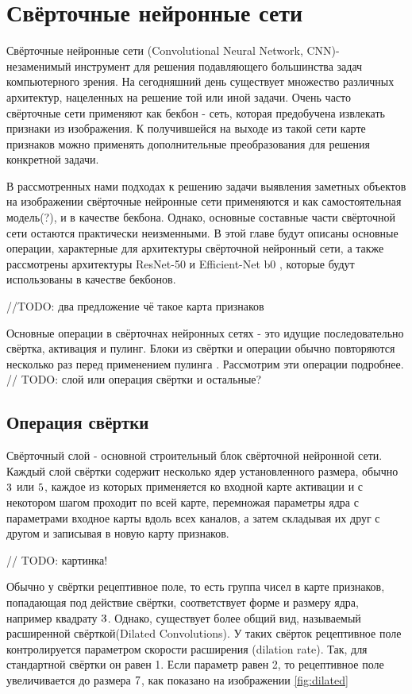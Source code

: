 \section{Свёрточные нейронные сети}


Свёрточные нейронные сети (Convolutional Neural Network, CNN)- незаменимый инструмент для решения подавляющего большинства задач компьютерного зрения. 
На сегодняшний день существует множество различных архитектур, нацеленных на решение той или иной задачи. 
Очень часто свёрточные сети применяют как бекбон - сеть, которая предобучена извлекать признаки из изображения. К получившейся 
на выходе из такой сети карте признаков можно применять дополнительные преобразования для решения конкретной задачи. 

В рассмотренных нами подходах к решению задачи выявления заметных объектов на изображении свёрточные нейронные сети 
применяются и как самостоятельная модель(?), и в качестве бекбона. Однако, основные составные части свёрточной сети 
остаются практически неизменными. В этой главе будут описаны основные операции, характерные для архитектуры свёрточной нейронный сети,
а также рассмотрены архитектуры ResNet-50\cite{ResNet} и Efficient-Net b0 \cite{Efficientnet}, которые будут использованы в качестве 
бекбонов.

//TODO: два предложение чё такое карта признаков

Основные операции в свёрточнах нейронных сетях - это идущие последовательно свёртка, активация и пулинг. Блоки из свёртки и операции
обычно повторяются несколько раз перед применением пулинга \cite{ResNet}. Рассмотрим эти операции подробнее.
// TODO: слой или операция свёртки и остальные? 


\subsection{Операция свёртки}

Свёрточный слой - основной строительный блок свёрточной нейронной сети. Каждый слой свёртки содержит несколько ядер установленного размера,
обычно $3 \time 3$ или $5 \time 5$, каждое из которых применяется ко входной карте активации и с некотором шагом проходит по всей карте,
перемножая параметры ядра с параметрами входное карты вдоль всех каналов, а затем складывая их друг с другом и записывая в новую карту признаков.

// TODO: картинка!

Обычно у свёртки рецептивное поле, то есть группа чисел в карте признаков, попадающая под действие свёртки,
соответствует форме и размеру ядра, например квадрату $3 \time 3$. Однако, существует более общий вид,
называемый расширенной свёрткой(Dilated Convolutions)\cite{Dilated}. У таких свёрток рецептивное поле контролируется параметром скорости
расширения (dilation rate). Так, для стандартной свёртки он равен 1. Если параметр равен 2, то рецептивное поле увеличивается
до размера $7 \time 7$, как показано на изображении \ref{fig:dilated}

